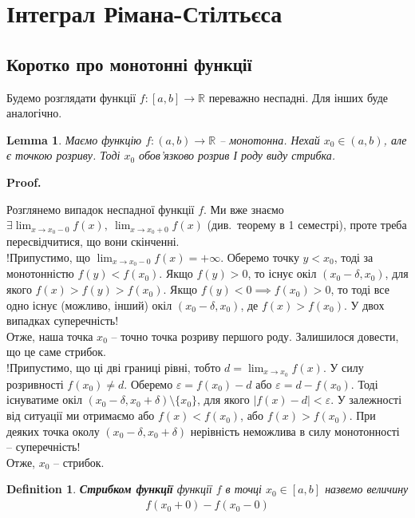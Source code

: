 \documentclass[a4paper, 10pt]{article}
\makeatletter
\theoremstyle{theoremdd}
\theoremstyle{theoremdd}
\theoremstyle{theoremdd}
\newtheorem{definition}[theorem]{Definition}
\theoremstyle{theoremdd}
\theoremstyle{theoremdd}
\theoremstyle{theoremdd}
\theoremstyle{theoremdd}
\theoremstyle{theoremdd}
\newtheorem{lemma}[theorem]{Lemma}
\theoremstyle{theoremdd}
\renewenvironment{proof}[1][Proof.\\]{\par
\pushQED{\hfill \qed}%
\normalfont \topsep6\p@\@plus6\p@\relax
\trivlist
\item\relax
{\bfseries
#1\@addpunct{.}}\hspace\labelsep\ignorespaces
}{%
\popQED\endtrivlist\@endpefalse
}
\makeatother
\begin{document}
\section{Інтеграл Рімана-Стілтьєса}
\subsection{Коротко про монотонні функції}
Будемо розглядати функції $f \colon [a,b] \to \mathbb{R}$ переважно неспадні. Для інших буде аналогічно.

\begin{lemma}
Маємо функцію $f \colon (a,b) \to \mathbb{R}$ -- монотонна. Нехай $x_0 \in (a,b)$, але є точкою розриву. Тоді $x_0$ обов'язково розрив І роду виду стрибка.
\end{lemma}

\begin{proof}
Розглянемо випадок неспадної функції $f$. Ми вже знаємо $\exists \displaystyle\lim_{x \to x_0-0} f(x),\ \displaystyle\lim_{x \to x_0+0} f(x)$ (див.\ теорему в 1 семестрі), проте треба пересвідчитися, що вони скінченні.\\
!Припустимо, що $\displaystyle\lim_{x \to x_0-0} f(x) = +\infty$. Оберемо точку $y < x_0$, тоді за монотонністю $f(y) < f(x_0)$. Якщо $f(y) > 0$, то існує окіл $(x_0-\delta,x_0)$, для якого $f(x) > f(y) > f(x_0)$. Якщо $f(y) < 0 \implies f(x_0) > 0$, то тоді все одно існує (можливо, інший) окіл $(x_0-\delta,x_0)$, де $f(x) > f(x_0)$. У двох випадках суперечність!\\
Отже, наша точка $x_0$ -- точно точка розриву першого роду. Залишилося довести, що це саме стрибок.\\
!Припустимо, що ці дві границі рівні, тобто $d = \displaystyle\lim_{x \to x_0} f(x)$. У силу розривності $f(x_0) \neq d$. Оберемо $\varepsilon = f(x_0) - d$ або $\varepsilon = d - f(x_0)$. Тоді існуватиме окіл $(x_0-\delta,x_0+\delta) \setminus \{x_0\}$, для якого $|f(x)-d| < \varepsilon$. У залежності від ситуації ми отримаємо або $f(x) < f(x_0)$, або $f(x) > f(x_0)$. При деяких точка околу $(x_0-\delta,x_0+\delta)$ нерівність неможлива в силу монотонності -- суперечність!\\
Отже, $x_0$ -- стрибок. 
\end{proof}

\begin{definition}
\textbf{Стрибком функції} функції $f$ в точці $x_0 \in [a,b]$ назвемо величину
\begin{align*}
f(x_0+0) - f(x_0-0)
\end{align*}
\end{definition}
\end{document}

